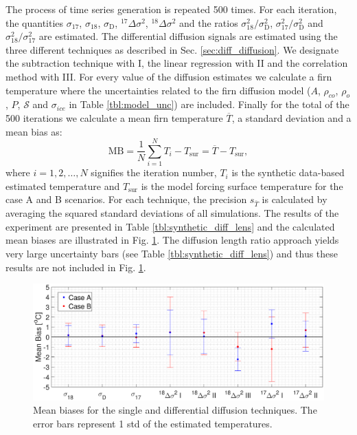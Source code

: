 \documentclass[11pt, draftcls, onecolumn]{IEEEtran} %
\numberwithin{equation}{section}
\numberwithin{table}{section}
\numberwithin{figure}{section}
\begin{document}
The process of time series generation is repeated 500 times. 
For each iteration, the quantities $\sigma_{17}$, $\sigma_{18}$,
$\sigma_\mathrm{D}$, ${}^{17}\Delta\sigma^2$, ${}^{18}\Delta\sigma^2$ and 
the ratios $\sigma^2_{18}/\sigma^2_{\mathrm{D}}$,
$\sigma^2_{17}/\sigma^2_{\mathrm{D}}$ and $\sigma^2_{18}/\sigma^2_{17}$ are estimated. 
The differential diffusion signals are estimated 
using the three different techniques as described in Sec. \ref{sec:diff_diffusion}.
We designate the subtraction technique with
I, the linear regression with II and the correlation method with III. 
For every value of the diffusion estimates we calculate a firn temperature where
the uncertainties related to the firn diffusion model ($A$, $\rho_{co}$, $\rho_o$, $P$, $\mathcal{S}$ and $\sigma_{ice}$ in Table \ref{tbl:model_unc}) are included. 
Finally for the total of the 500 iterations we calculate a mean firn temperature $\overline{T}$, 
a standard deviation and a mean bias as: 
\begin{equation}
\text{MB} = \frac{1}{N} \sum_{i = 1}^{N} T_i - T_{\text{sur}} = \overline{T} - T_{\text{sur}},
\end{equation}
where $i = 1,2,\dots,N$ signifies the iteration number, $T_i$ is the synthetic 
data-based estimated temperature and $T_{\text{sur}}$ is the model forcing  
surface temperature for the case A and B scenarios.
For each technique, the precision $s_{\bar{T}}$ is calculated by averaging 
the squared standard deviations of all simulations. 
The results of the experiment are presented in Table \ref{tbl:synthetic_diff_lens} and the calculated 
mean biases are illustrated in Fig. \ref{fig:synthetic_data_bias}.
The diffusion length ratio approach yields very large uncertainty bars (see Table \ref{tbl:synthetic_diff_lens}) and thus these results are not 
included in Fig. \ref{fig:synthetic_data_bias}. 


\begin{figure}[]
	\vspace*{2mm}
	\begin{center}
		\includegraphics[width=\textwidth]{Figure_10}
		\caption{Mean biases for the single and differential diffusion techniques.
			The error bars represent 1 std of the estimated temperatures.}  \label{fig:synthetic_data_bias}
	\end{center}
\end{figure}
\end{document}
